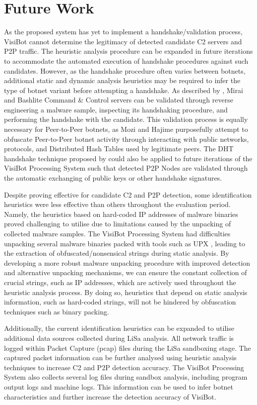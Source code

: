 \section{Future Work}

As the proposed system has yet to implement a handshake/validation process, VisiBot cannot determine the legitimacy of detected candidate C2 servers and P2P traffic. The heuristic analysis procedure can be expanded in future iterations to accommodate the automated execution of handshake procedures against such candidates. However, as the handshake procedure often varies between botnets, additional static and dynamic analysis heuristics may be required to infer the type of botnet variant before attempting a handshake. As described by \citet{Bastos2019}, Mirai and Bashlite Command \& Control servers can be validated through reverse engineering a malware sample, inspecting its handshaking procedure, and performing the handshake with the candidate. This validation process is equally necessary for Peer-to-Peer botnets, as Mozi and Hajime purposefully attempt to obfuscate Peer-to-Peer botnet activity through interacting with public networks, protocols, and Distributed Hash Tables used by legitimate peers. \citep{Netlab2019} The DHT handshake technique proposed by \citet{Herwig2019} could also be applied to future iterations of the VisiBot Processing System such that detected P2P Nodes are validated through the automatic exchanging of public keys or other handshake signatures.

Despite proving effective for candidate C2 and P2P detection, some identification heuristics were less effective than others throughout the evaluation period. Namely, the heuristics based on hard-coded IP addresses of malware binaries proved challenging to utilise due to limitations caused by the unpacking of collected malware samples. The VisiBot Processing System had difficulties unpacking several malware binaries packed with tools such as UPX \citep{UPX}, leading to the extraction of obfuscated/nonsensical strings during static analysis. By developing a more robust malware unpacking procedure with improved detection and alternative unpacking mechanisms, we can ensure the constant collection of crucial strings, such as IP addresses, which are actively used throughout the heuristic analysis process. By doing so, heuristics that depend on static analysis information, such as hard-coded strings, will not be hindered by obfuscation techniques such as binary packing.

Additionally, the current identification heuristics can be expanded to utilise additional data sources collected during LiSa analysis. All network traffic is logged within Packet Capture (pcap) files during the LiSa sandboxing stage. The captured packet information can be further analysed using heuristic analysis techniques to increase C2 and P2P detection accuracy. The VisiBot Processing System also collects several log files during sandbox analysis, including program output logs and machine logs. This information can be used to infer botnet characteristics and further increase the detection accuracy of VisiBot. 

